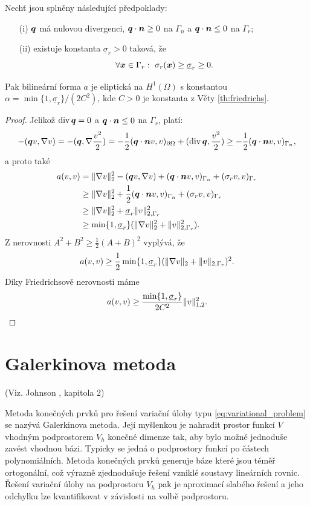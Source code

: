 \begin{veta}
Nechť jsou splněny následující předpoklady:
\begin{itemize}
\item[(i)] $\mathbf{\boldsymbol{q}}$ má nulovou divergenci, $\mathbf{\boldsymbol{q}}\cdot\mathbf{\boldsymbol{n}}\ge 0$ na $\Gamma_n$ a $\mathbf{\boldsymbol{q}}\cdot\mathbf{\boldsymbol{n}}\le 0$ na $\Gamma_r$;
\item[(ii)] existuje konstanta $\underline\sigma_r>0$ taková, že
\[ \forall\mathbf{\boldsymbol{x}}\in\Gamma_r:~\sigma_r(\mathbf{\boldsymbol{x}})\ge\underline\sigma_r\ge 0. \]
\end{itemize}
Pak bilineární forma $a$ je eliptická na $H^1(\Omega)$ s konstantou $\alpha=\min\{1,\underline\sigma_r\}/(2C^2)$, kde $C>0$ je konstanta z Věty \ref{th:friedrichs}.
\end{veta}
\begin{proof}
Jelikož $\operatorname{div}\mathbf{\boldsymbol{q}}=0$ a $\mathbf{\boldsymbol{q}}\cdot\mathbf{\boldsymbol{n}}\le 0$ na $\Gamma_r$, platí:
\[ -(\mathbf{\boldsymbol{q}} v,\nabla v) = -(\mathbf{\boldsymbol{q}},\nabla\frac{v^2}2) = -\frac12(\mathbf{\boldsymbol{q}}\cdot\mathbf{\boldsymbol{n}} v,v)_{\partial\Omega} +(\operatorname{div}\mathbf{\boldsymbol{q}},\frac{v^2}2) \ge -\frac12(\mathbf{\boldsymbol{q}}\cdot\mathbf{\boldsymbol{n}} v,v)_{\Gamma_n}, \]
a proto také
\begin{align*}
a(v,v) & = \|\nabla v\|_2^2 - (\mathbf{\boldsymbol{q}} v,\nabla v) + (\mathbf{\boldsymbol{q}}\cdot\mathbf{\boldsymbol{n}} v,v)_{\Gamma_n} + (\sigma_r v,v)_{\Gamma_r}\\
&\ge \|\nabla v\|_2^2 + \frac12 (\mathbf{\boldsymbol{q}}\cdot\mathbf{\boldsymbol{n}} v,v)_{\Gamma_n} + (\sigma_r v,v)_{\Gamma_r}\\
&\ge \|\nabla v\|_2^2 + \underline\sigma_r\|v\|_{2,\Gamma_r}^2\\
&\ge \min\{1,\underline\sigma_r\}(\|\nabla v\|_2^2 + \|v\|_{2,\Gamma_r}^2).
\end{align*}
Z nerovnosti $A^2+B^2\ge \frac12(A+B)^2$ vyplývá, že
\[ a(v,v) \ge \frac12\min\{1,\underline\sigma_r\}(\|\nabla v\|_2 + \|v\|_{2,\Gamma_r})^2. \]
Díky Friedrichsově nerovnosti máme
\[ a(v,v) \ge \frac{\min\{1,\underline\sigma_r\}}{2C^2}\| v\|_{1,2}^2. \]
\end{proof}








\section{Galerkinova metoda}
(Viz. Johnson \cite{Johnson}, kapitola 2)

Metoda konečných prvků pro řešení variační úlohy typu \eqref{eq:variational_problem} se nazývá Galerkinova metoda.
Její myšlenkou je nahradit prostor funkcí $V$ vhodným podprostorem $V_h$ konečné dimenze tak, aby bylo možné jednoduše zavést vhodnou bázi.
Typicky se jedná o podprostory funkcí po částech polynomiálních.
Metoda konečných prvků generuje báze které jsou téměř ortogonální, což výrazně zjednodušuje řešení vzniklé soustavy lineárních rovnic.
Řešení variační úlohy na podprostoru $V_h$ pak je aproximací slabého řešení a jeho odchylku lze kvantifikovat v závislosti na volbě podprostoru.

